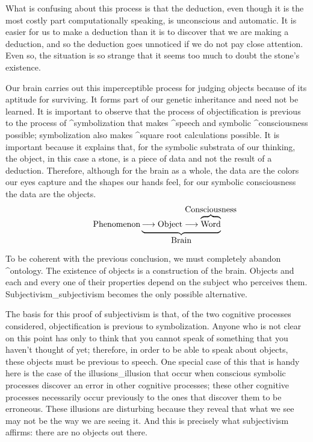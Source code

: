 What is confusing about this process is that the deduction, even though
it is the most costly part computationally speaking, is unconscious and
automatic. It is easier for us to make a deduction than it is to
discover that we are making a deduction, and so the deduction goes
unnoticed if we do not pay close attention. Even so, the situation is so
strange that it seems too much to doubt the stone's existence.

Our brain carries out this imperceptible process for judging objects
because of its aptitude for surviving. It forms part of our genetic
inheritance and need not be learned. It is important to observe that the
process of objectification is previous to the process of
^{symbolization} that makes ^{speech} and symbolic ^{consciousness}
possible; symbolization also makes ^{square root} calculations possible.
It is important because it explains that, for the symbolic substrata of
our thinking, the object, in this case a stone, is a piece of data and
not the result of a deduction. Therefore, although for the brain as a
whole, the data are the colors our eyes capture and the shapes our hands
feel, for our symbolic consciousness the data are the objects.
\abovedisplayskip=24pt
$$\hbox{Phenomenon} \underbrace{\longrightarrow \hbox{Object}
 \longrightarrow
 \overbrace{\hbox{\strut Word}}^{\hbox to 0pt{\hss
  Consciousness\hss}}}_{\hbox{Brain}}$$
\abovedisplayskip=12pt

To be coherent with the previous conclusion, we must completely abandon
^{ontology}. The existence of objects is a construction of the brain.
Objects and each and every one of their properties depend on the subject
who perceives them. Subjectivism_{subjectivism} becomes the only
possible alternative.

The basis for this proof of subjectivism is that, of the two cognitive
processes considered, objectification is previous to symbolization.
Anyone who is not clear on this point has only to think that you cannot
speak of something that you haven't thought of yet; therefore, in order
to be able to speak about objects, these objects must be previous to
speech. One special case of this that is handy here is the case of the
illusions_{illusion} that occur when conscious symbolic processes
discover an error in other cognitive processes; these other cognitive
processes necessarily occur previously to the ones that discover them to
be erroneous. These illusions are disturbing because they reveal that
what we see may not be the way we are seeing it. And this is precisely
what subjectivism affirms: there are no objects out there.

